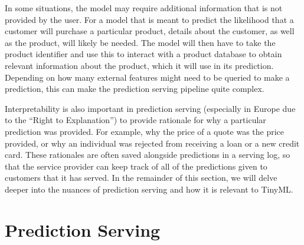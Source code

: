 {{{{{{    In some situations, the model may require additional information that is not provided by the user. For a model that is meant to predict the likelihood that a customer will purchase a particular product, details about the customer, as well as the product, will likely be needed. The model will then have to take the product identifier and use this to interact with a product database to obtain relevant information about the product, which it will use in its prediction. Depending on how many external features might need to be queried to make a prediction, this can make the prediction serving pipeline quite complex.
    
    Interpretability is also important in prediction serving (especially in Europe due to the “Right to Explanation”) to provide rationale for why a particular prediction was provided. For example, why the price of a quote was the price provided, or why an individual was rejected from receiving a loan or a new credit card. These rationales are often saved alongside predictions in a serving log, so that the service provider can keep track of all of the predictions given to customers that it has served. In the remainder of this section, we will delve deeper into the nuances of prediction serving and how it is relevant to TinyML.
        
\section{Prediction Serving}

}}}}}}

